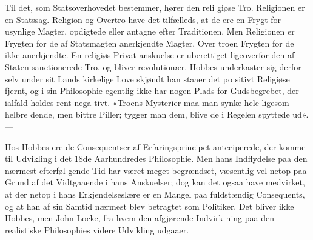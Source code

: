 \documentclass[12pt,a4paper]{book}
\begin{document}
Til det, som Statsoverhovedet bestemmer, hører den reli\-%
giøse Tro. Religionen er en Statssag. Religion og Overtro
have det tilfælleds, at de ere en Frygt for usynlige Magter,
opdigtede eller antagne efter Traditionen. Men Religionen er
Frygten for de af Statsmagten anerkjendte Magter, Over\-%
troen Frygten for de ikke anerkjendte. En religiøs Privat\-%
anskuelse er uberettiget ligeoverfor den af Staten sanctionerede
Tro, og bliver revolutionær. Hobbes underkaster sig derfor
selv under sit Lands kirkelige Love skjøndt han staaer det po\-%
sitivt Religiøse fjernt, og i sin Philosophie egentlig ikke har
nogen Plads for Gudsbegrebet, der ialfald holdes rent nega\-%
tivt. «Troens Mysterier maa man synke hele ligesom helbre\-%
dende, men bittre Piller; tygger man dem, blive de i Regelen
spyttede ud». ---

Hos Hobbes ere de Consequentser af Erfaringsprincipet
anteciperede, der komme til Udvikling i det 18de Aarhundredes
Philosophie. Men hans Indflydelse paa den nærmest efterføl\-%
gende Tid har været meget begrændset, væsentlig vel netop
paa Grund af det Vidtgaaende i hans Anskuelser; dog kan det
ogsaa have medvirket, at der netop i hans Erkjendelseslære er
en Mangel paa fuldstændig Consequents, og at han af sin
Samtid nærmest blev betragtet som Politiker. Det bliver ikke
Hobbes, men John Locke, fra hvem den afgjørende Indvirk\-%
ning paa den realistiske Philosophies videre Udvikling udgaaer.
\end{document}
